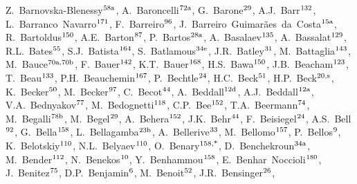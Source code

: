 \begin{flushleft}
Z.~Barnovska-Blenessy$^\textrm{\scriptsize 58a}$,    
A.~Baroncelli$^\textrm{\scriptsize 72a}$,    
G.~Barone$^\textrm{\scriptsize 29}$,    
A.J.~Barr$^\textrm{\scriptsize 132}$,    
L.~Barranco~Navarro$^\textrm{\scriptsize 171}$,    
F.~Barreiro$^\textrm{\scriptsize 96}$,    
J.~Barreiro~Guimar\~{a}es~da~Costa$^\textrm{\scriptsize 15a}$,    
R.~Bartoldus$^\textrm{\scriptsize 150}$,    
A.E.~Barton$^\textrm{\scriptsize 87}$,    
P.~Bartos$^\textrm{\scriptsize 28a}$,    
A.~Basalaev$^\textrm{\scriptsize 135}$,    
A.~Bassalat$^\textrm{\scriptsize 129}$,    
R.L.~Bates$^\textrm{\scriptsize 55}$,    
S.J.~Batista$^\textrm{\scriptsize 164}$,    
S.~Batlamous$^\textrm{\scriptsize 34e}$,    
J.R.~Batley$^\textrm{\scriptsize 31}$,    
M.~Battaglia$^\textrm{\scriptsize 143}$,    
M.~Bauce$^\textrm{\scriptsize 70a,70b}$,    
F.~Bauer$^\textrm{\scriptsize 142}$,    
K.T.~Bauer$^\textrm{\scriptsize 168}$,    
H.S.~Bawa$^\textrm{\scriptsize 150}$,    
J.B.~Beacham$^\textrm{\scriptsize 123}$,    
T.~Beau$^\textrm{\scriptsize 133}$,    
P.H.~Beauchemin$^\textrm{\scriptsize 167}$,    
P.~Bechtle$^\textrm{\scriptsize 24}$,    
H.C.~Beck$^\textrm{\scriptsize 51}$,    
H.P.~Beck$^\textrm{\scriptsize 20,s}$,    
K.~Becker$^\textrm{\scriptsize 50}$,    
M.~Becker$^\textrm{\scriptsize 97}$,    
C.~Becot$^\textrm{\scriptsize 44}$,    
A.~Beddall$^\textrm{\scriptsize 12d}$,    
A.J.~Beddall$^\textrm{\scriptsize 12a}$,    
V.A.~Bednyakov$^\textrm{\scriptsize 77}$,    
M.~Bedognetti$^\textrm{\scriptsize 118}$,    
C.P.~Bee$^\textrm{\scriptsize 152}$,    
T.A.~Beermann$^\textrm{\scriptsize 74}$,    
M.~Begalli$^\textrm{\scriptsize 78b}$,    
M.~Begel$^\textrm{\scriptsize 29}$,    
A.~Behera$^\textrm{\scriptsize 152}$,    
J.K.~Behr$^\textrm{\scriptsize 44}$,    
F.~Beisiegel$^\textrm{\scriptsize 24}$,    
A.S.~Bell$^\textrm{\scriptsize 92}$,    
G.~Bella$^\textrm{\scriptsize 158}$,    
L.~Bellagamba$^\textrm{\scriptsize 23b}$,    
A.~Bellerive$^\textrm{\scriptsize 33}$,    
M.~Bellomo$^\textrm{\scriptsize 157}$,    
P.~Bellos$^\textrm{\scriptsize 9}$,    
K.~Belotskiy$^\textrm{\scriptsize 110}$,    
N.L.~Belyaev$^\textrm{\scriptsize 110}$,    
O.~Benary$^\textrm{\scriptsize 158,*}$,    
D.~Benchekroun$^\textrm{\scriptsize 34a}$,    
M.~Bender$^\textrm{\scriptsize 112}$,    
N.~Benekos$^\textrm{\scriptsize 10}$,    
Y.~Benhammou$^\textrm{\scriptsize 158}$,    
E.~Benhar~Noccioli$^\textrm{\scriptsize 180}$,    
J.~Benitez$^\textrm{\scriptsize 75}$,    
D.P.~Benjamin$^\textrm{\scriptsize 6}$,    
M.~Benoit$^\textrm{\scriptsize 52}$,    
J.R.~Bensinger$^\textrm{\scriptsize 26}$,    

\end{flushleft}
